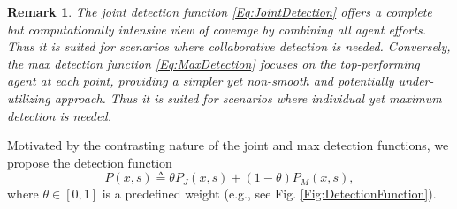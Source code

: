 \documentclass[letterpaper, 10 pt, conference]{ieeeconf}
\newtheorem{remark}{Remark}
\begin{document}
\begin{remark}\label{Rm:DetectionFunction}
The joint detection function \eqref{Eq:JointDetection} offers a complete but computationally intensive view of coverage by combining all agent efforts. Thus it is suited for scenarios where collaborative detection is needed. Conversely, the max detection function \eqref{Eq:MaxDetection} focuses on the top-performing agent at each point, providing a simpler yet non-smooth and potentially under-utilizing approach. Thus it is suited for scenarios where individual yet maximum detection is needed. 
\end{remark}




Motivated by the contrasting nature of the joint and max detection functions, we propose the detection function
\begin{equation}\label{Eq:DetectionFunction}
    P(x,s) \triangleq \theta P_J(x,s) + (1-\theta) P_M(x,s),
\end{equation}
where $\theta\in[0,1]$ is a predefined weight (e.g., see Fig. \ref{Fig:DetectionFunction}).  
\end{document}
